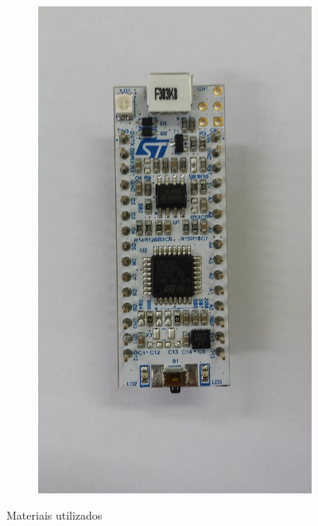 \begin{frame}
\begin{figure}[noframenumbering]
\begin{subfigure}[b]{0.2\textwidth}
         \includegraphics[width=\textwidth,height=0.3\textheight,keepaspectratio]{Figuras/nucleo.jpg}
         \caption{\centering \label{fig:Posicaofjksfjdlkfj}}
     \end{subfigure}
     
     \caption{Materiais utilizados}     
 \end{figure}
\end{frame}

